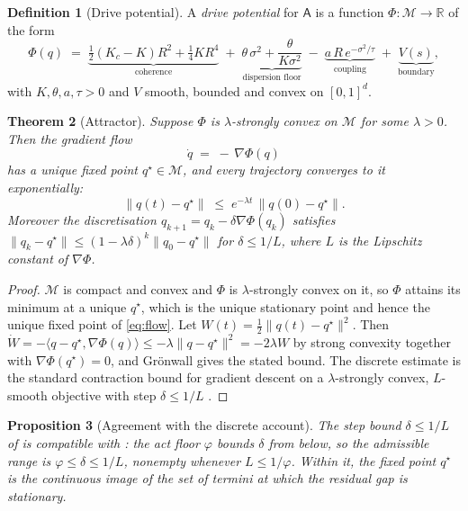\documentclass[11pt,a4paper]{article}
\theoremstyle{clstyle}
\newtheorem{theorem}{Theorem}[section]
\newtheorem{proposition}[theorem]{Proposition}
\theoremstyle{definition}
\newtheorem{definition}[theorem]{Definition}
\theoremstyle{remark}
\newcommand{\R}{\mathbb{R}}
\newcommand{\Ag}{\mathsf{A}}
\newcommand{\Ord}{R}
\newcommand{\Kc}{K_{c}}
\newcommand{\norm}[1]{\lVert#1\rVert}
\newcommand{\Pot}{\Phi}
\begin{document}
\begin{definition}[Drive potential]
\label{def:potential}
A \emph{drive potential} for $\Ag$ is a function
$\Pot:\mathcal{M}\to\R$ of the form
\begin{equation}
\Pot(q) \;=\; \underbrace{\tfrac{1}{2}(\Kc-K)\Ord^{2}+\tfrac{1}{4}K\Ord^{4}}_{\text{coherence}}
\;+\;\underbrace{\theta\,\sigma^{2}+\frac{\theta}{K\sigma^{2}}}_{\text{dispersion floor}}
\;-\;\underbrace{a\,\Ord\,e^{-\sigma^{2}/\tau}}_{\text{coupling}}
\;+\;\underbrace{V(s)}_{\text{boundary}},
\label{eq:potential}
\end{equation}
with $K,\theta,a,\tau>0$ and $V$ smooth, bounded and convex on $[0,1]^d$.
\end{definition}

\begin{theorem}[Attractor]
\label{thm:attractor}
Suppose $\Pot$ is $\lambda$-strongly convex on $\mathcal{M}$ for some
$\lambda>0$. Then the gradient flow
\begin{equation}
\dot q \;=\; -\,\nabla\Pot(q)
\label{eq:flow}
\end{equation}
has a unique fixed point $q^{\star}\in\mathcal{M}$, and every trajectory
converges to it exponentially:
\begin{equation}
\norm{q(t)-q^{\star}} \;\le\; e^{-\lambda t}\,\norm{q(0)-q^{\star}}.
\end{equation}
Moreover the discretisation $q_{k+1}=q_k-\delta\nabla\Pot(q_k)$ satisfies
$\norm{q_k-q^{\star}}\le(1-\lambda\delta)^{k}\norm{q_0-q^{\star}}$ for
$\delta\le1/L$, where $L$ is the Lipschitz constant of $\nabla\Pot$.
\end{theorem}

\begin{proof}
$\mathcal{M}$ is compact and convex and $\Pot$ is $\lambda$-strongly convex
on it, so $\Pot$ attains its minimum at a unique $q^{\star}$, which is the
unique stationary point and hence the unique fixed point of \eqref{eq:flow}.
Let $W(t)=\tfrac12\norm{q(t)-q^{\star}}^2$. Then
$\dot W=-\langle q-q^{\star},\nabla\Pot(q)\rangle\le-\lambda\norm{q-q^\star}^2=-2\lambda W$
by strong convexity together with $\nabla\Pot(q^{\star})=0$, and Gr\"onwall
gives the stated bound. The discrete estimate is the standard contraction
bound for gradient descent on a $\lambda$-strongly convex, $L$-smooth
objective with step $\delta\le1/L$ \citep{boyd2004convex}.
\end{proof}

\begin{proposition}[Agreement with the discrete account]
\label{prop:agreement}
The step bound $\delta\le1/L$ of  is compatible with
: the act floor $\varphi$ bounds $\delta$ from below, so
the admissible range is $\varphi\le\delta\le1/L$, nonempty whenever
$L\le1/\varphi$. Within it, the fixed point $q^{\star}$ is the continuous
image of the set of termini at which the residual gap is stationary.
\end{proposition}
\end{document}
